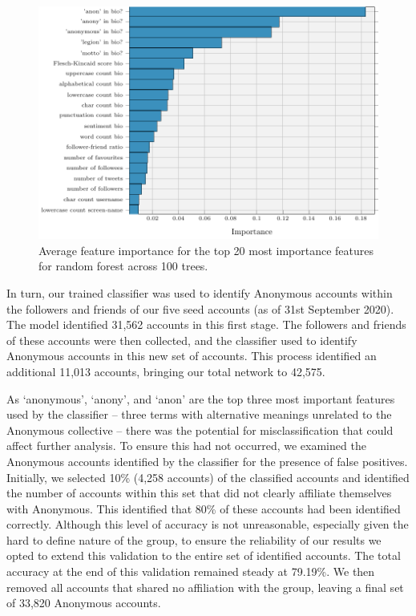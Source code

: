 \documentclass[letterpaper]{article}
\begin{document}
\begin{figure}[!ht]
\centering
\includegraphics[width=0.9\linewidth]{RF_feature_importance.pdf}
\caption{Average feature importance for the top 20 most importance features for random forest across 100 trees.}
\label{fig:featureImportance}
\end{figure}

In turn, our trained classifier was used to identify Anonymous accounts within the followers and friends of our five seed accounts (as of 31st September 2020). The model identified 31,562 accounts in this first stage. The followers and friends of these accounts were then collected, and the classifier used to identify Anonymous accounts in this new set of accounts. This process identified an additional 11,013 accounts, bringing our total network to 42,575.

As `anonymous', `anony', and `anon' are the top three most important features used by the classifier -- three terms with alternative meanings unrelated to the Anonymous collective -- there was the potential for misclassification that could affect further analysis. To ensure this had not occurred, we examined the Anonymous accounts identified by the classifier for the presence of false positives. Initially, we selected 10\% (4,258 accounts) of the classified accounts and identified the number of accounts within this set that did not clearly affiliate themselves with Anonymous. This identified that 80\% of these accounts had been identified correctly. Although this level of accuracy is not unreasonable, especially given the hard to define nature of the group, to ensure the reliability of our results we opted to extend this validation to the entire set of identified accounts. The total accuracy at the end of this validation remained steady at 79.19\%. We then removed all accounts that shared no affiliation with the group, leaving a final set of 33,820 Anonymous accounts.
\end{document}
